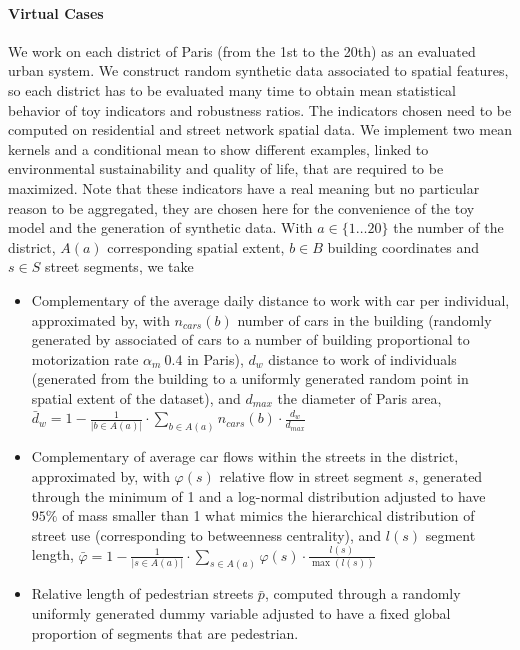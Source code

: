 \documentclass[runningheads,a4paper]{llncs2e/llncs}
\begin{document}



\paragraph{Virtual Cases}

We work on each district of Paris (from the 1st to the 20th) as an evaluated urban system. We construct random synthetic data associated to spatial features, so each district has to be evaluated many time to obtain mean statistical behavior of toy indicators and robustness ratios. The indicators chosen need to be computed on residential and street network spatial data. We implement two mean kernels and a conditional mean to show different examples, linked to environmental sustainability and quality of life, that are required to be maximized. Note that these indicators have a real meaning but no particular reason to be aggregated, they are chosen here for the convenience of the toy model and the generation of synthetic data. With $a\in \{1\ldots 20\}$ the number of the district, $A(a)$ corresponding spatial extent, $b\in B$ building coordinates and $s\in S$ street segments, we take
\begin{itemize}
\item Complementary of the average daily distance to work with car per individual, approximated by, with $n_{cars}(b)$ number of cars in the building (randomly generated by associated of cars to a number of building proportional to motorization rate $\alpha_m ~ 0.4$ in Paris), $d_w$ distance to work of individuals (generated from the building to a uniformly generated random point in spatial extent of the dataset), and $d_{max}$ the diameter of Paris area, $\bar{d}_w = 1 - \frac{1}{|b\in A(a)|} \cdot \sum_{b\in A(a)}{n_{cars}(b)\cdot \frac{d_w}{d_{max}}}$
\item Complementary of average car flows within the streets in the district, approximated by, with $\varphi(s)$ relative flow in street segment $s$, generated through the minimum of 1 and a log-normal distribution adjusted to have $95\%$ of mass smaller than 1 what mimics the hierarchical distribution of street use (corresponding to betweenness centrality), and $l(s)$ segment length, $\bar{\varphi} = 1 - \frac{1}{|s\in A(a)|} \cdot \sum_{s \in A(a)}{\varphi(s)\cdot \frac{l(s)}{\max{(l(s))}}}$

\item Relative length of pedestrian streets $\bar{p}$, computed through a randomly uniformly generated dummy variable adjusted to have a fixed global proportion of segments that are pedestrian.
\end{itemize}
\end{document}
